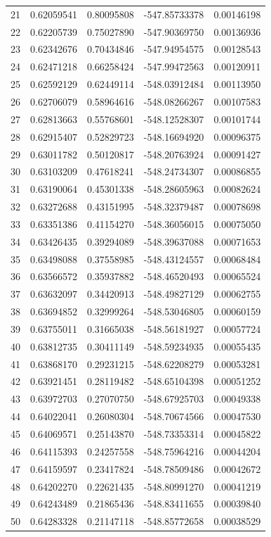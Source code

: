 \documentclass{article}
\begin{document}
\begin{table}[H]
\begin{tabular}{|c|c| c| c| c | }
21 & 0.62059541 & 0.80095808 & -547.85733378 & 0.00146198 \\
22 & 0.62205739 & 0.75027890 & -547.90369750 & 0.00136936 \\
23 & 0.62342676 & 0.70434846 & -547.94954575 & 0.00128543 \\
24 & 0.62471218 & 0.66258424 & -547.99472563 & 0.00120911 \\
25 & 0.62592129 & 0.62449114 & -548.03912484 & 0.00113950 \\
26 & 0.62706079 & 0.58964616 & -548.08266267 & 0.00107583 \\
27 & 0.62813663 & 0.55768601 & -548.12528307 & 0.00101744 \\
28 & 0.62915407 & 0.52829723 & -548.16694920 & 0.00096375 \\
29 & 0.63011782 & 0.50120817 & -548.20763924 & 0.00091427 \\
30 & 0.63103209 & 0.47618241 & -548.24734307 & 0.00086855 \\
31 & 0.63190064 & 0.45301338 & -548.28605963 & 0.00082624 \\
32 & 0.63272688 & 0.43151995 & -548.32379487 & 0.00078698 \\
33 & 0.63351386 & 0.41154270 & -548.36056015 & 0.00075050 \\
34 & 0.63426435 & 0.39294089 & -548.39637088 & 0.00071653 \\
35 & 0.63498088 & 0.37558985 & -548.43124557 & 0.00068484 \\
36 & 0.63566572 & 0.35937882 & -548.46520493 & 0.00065524 \\
37 & 0.63632097 & 0.34420913 & -548.49827129 & 0.00062755 \\
38 & 0.63694852 & 0.32999264 & -548.53046805 & 0.00060159 \\
39 & 0.63755011 & 0.31665038 & -548.56181927 & 0.00057724 \\
40 & 0.63812735 & 0.30411149 & -548.59234935 & 0.00055435 \\
41 & 0.63868170 & 0.29231215 & -548.62208279 & 0.00053281 \\
42 & 0.63921451 & 0.28119482 & -548.65104398 & 0.00051252 \\
43 & 0.63972703 & 0.27070750 & -548.67925703 & 0.00049338 \\
44 & 0.64022041 & 0.26080304 & -548.70674566 & 0.00047530 \\
45 & 0.64069571 & 0.25143870 & -548.73353314 & 0.00045822 \\
46 & 0.64115393 & 0.24257558 & -548.75964216 & 0.00044204 \\
47 & 0.64159597 & 0.23417824 & -548.78509486 & 0.00042672 \\
48 & 0.64202270 & 0.22621435 & -548.80991270 & 0.00041219 \\
49 & 0.64243489 & 0.21865436 & -548.83411655 & 0.00039840 \\
50 & 0.64283328 & 0.21147118 & -548.85772658 & 0.00038529 \\
        \hline
    \end{tabular}
    \end{table}
\newpage
\end{document}
